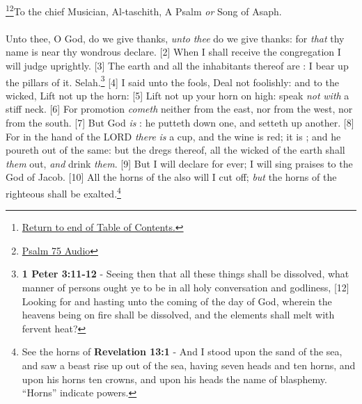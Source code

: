 \footnote{\textcolor[rgb]{0.00,0.25,0.00}{\hyperlink{TOC}{Return to end of Table of Contents.}}}\footnote{\href{https://audiobible.com/bible/psalms_75.html}{\textcolor[cmyk]{0.99998,1,0,0}{Psalm 75 Audio}}}\textcolor[cmyk]{0.99998,1,0,0}{To the chief Musician, Al-taschith, A Psalm \emph{or} Song of Asaph.}\\
\\
\textcolor[cmyk]{0.99998,1,0,0}{Unto thee, O God, do we give thanks, \emph{unto} \emph{thee} do we give thanks: for \emph{that} thy name is near thy wondrous  declare.}
[2] \textcolor[cmyk]{0.99998,1,0,0}{When I shall receive the congregation I will judge uprightly.}
[3] \textcolor[cmyk]{0.99998,1,0,0}{The earth and all the inhabitants thereof are : I bear up the pillars of it. Selah.}\footnote{\textbf{1 Peter 3:11-12} - Seeing then that all these things shall be dissolved, what manner of persons ought ye to be in all holy conversation and godliness, [12] Looking for and hasting unto the coming of the day of God, wherein the heavens being on fire shall be dissolved, and the elements shall melt with fervent heat?}
[4] \textcolor[cmyk]{0.99998,1,0,0}{I said unto the fools, Deal not foolishly: and to the wicked, Lift not up the horn:}
[5] \textcolor[cmyk]{0.99998,1,0,0}{Lift not up your horn on high: speak \emph{not} \emph{with} a stiff neck.}
[6] \textcolor[cmyk]{0.99998,1,0,0}{For promotion \emph{cometh} neither from the east, nor from the west, nor from the south.}
[7] \textcolor[cmyk]{0.99998,1,0,0}{But God \emph{is} : he putteth down one, and setteth up another.}
[8] \textcolor[cmyk]{0.99998,1,0,0}{For in the hand of the LORD \emph{there} \emph{is} a cup, and the wine is red; it is ; and he poureth out of the same: but the dregs thereof, all the wicked of the earth shall  \emph{them} out, \emph{and} drink \emph{them}.}
[9] \textcolor[cmyk]{0.99998,1,0,0}{But I will declare for ever; I will sing praises to the God of Jacob.}
[10] \textcolor[cmyk]{0.99998,1,0,0}{All the horns of the  also will I cut off; \emph{but} the horns of the righteous shall be exalted.}\footnote{See the horns of \textbf{Revelation 13:1} - And I stood upon the sand of the sea, and saw a beast rise up out of the sea, having seven heads and ten horns, and upon his horns ten crowns, and upon his heads the name of blasphemy. ``Horns'' indicate powers.} 
